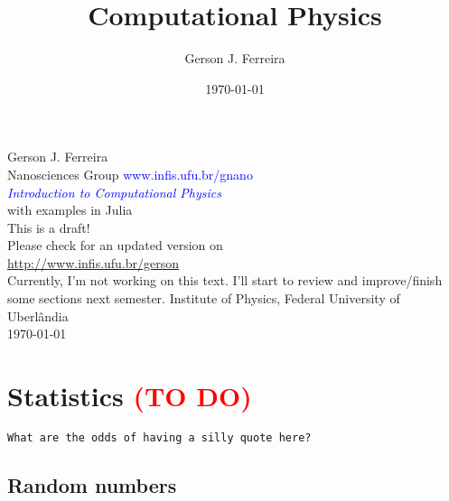 \documentclass[a4paper,openright,12pt]{memoir}
\title{Computational Physics}
\author{Gerson J. Ferreira}
\date{\today}
\numberwithin{ctExample}{chapter}
\numberwithin{ctProblem}{chapter}
\begin{document}
\frenchspacing

\frontmatter

\begin{titlingpage}
\phantom{xxx}
\vspace{0.5cm}
\huge
\raggedright
Gerson J. Ferreira \\ \normalsize Nanosciences Group \textcolor{blue}{www.infis.ufu.br/gnano}
\\
\vspace{2.5cm}
\huge 
{\raggedleft
\textit{\textcolor{blue}{Introduction to Computational Physics}}\\
\Large 
with examples in Julia \\
}
\centering
\vspace{4cm}
\huge This is a draft!\\
\Large
Please check for an updated version on\\
\url{http://www.infis.ufu.br/gerson}
\\
\large
Currently, I'm not working on this text. I'll start to review and improve/finish some sections next semester.
\vfill
\Large
Institute of Physics, Federal University of Uberlândia \\ \today
\end{titlingpage}

\renewcommand{\baselinestretch}{1.2}\normalsize
\tableofcontents*
\renewcommand{\baselinestretch}{1.0}\normalsize

\mainmatter











\chapter{Statistics \textcolor{red}{(TO DO)}}
\vspace*{-1cm}
\begin{flushright}
\texttt{What are the odds of having a silly quote here?}
\end{flushright}

\section{Random numbers}
\end{document}
